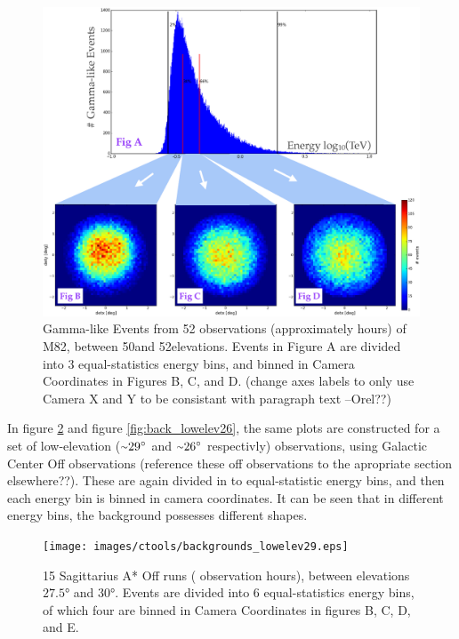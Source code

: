 \begin{figure}[ht]
  \begin{center}
    \includegraphics[width=\textwidth]{images/ctools/backgrounds_highelev.eps}
    \caption[FITS Background at 50\degree Elevation]{Gamma-like Events from 52 observations (approximately  hours) of M82, between 50\degree  and 52\degree  elevations.  Events in Figure A are divided into 3 equal-statistics energy bins, and binned in Camera Coordinates in Figures B, C, and D. (change axes labels to only use Camera X and Y to be consistant with paragraph text --Orel??)}\label{fig:back_highelev}
  \end{center}
\end{figure}

In figure \ref{fig:back_lowelev29} and figure \ref{fig:back_lowelev26}, the same plots are constructed for a set of low-elevation ($ \nicetilde \ang{29} $ and $ \nicetilde \ang{26} $ respectivly) observations, using Galactic Center Off observations (reference these off observations to the apropriate section elsewhere??).
These are again divided in to equal-statistic energy bins, and then each energy bin is binned in camera coordinates.
It can be seen that in different energy bins, the background possesses different shapes.

\begin{figure}[ht]
  \begin{center}
    \texttt{[image: images/ctools/backgrounds\_lowelev29.eps]}
    \caption[CTOOLS Background at 29\degree Elevation]{15 Sagittarius A* Off runs ( observation hours), between elevations $ \ang{27.5} $ and $ \ang{30} $.  Events are divided into 6 equal-statistics energy bins, of which four are binned in Camera Coordinates in figures B, C, D, and E.}\label{fig:back_lowelev29}
  \end{center}
\end{figure}

